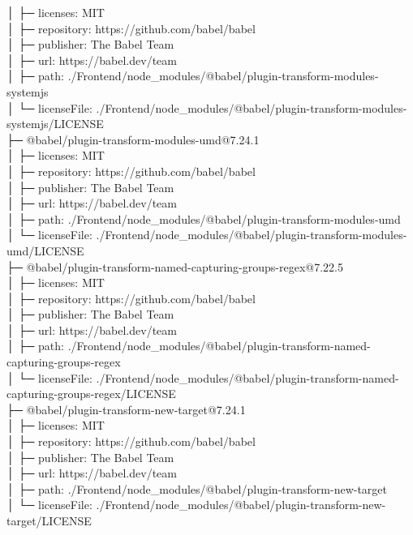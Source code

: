 \documentclass[
    paper=a4,
    twoside=false,
    parskip=half,
    listof=entryprefix,
    listof=totoc,
    index=totoc,
    bibliography=totoc,
    headsepline,
]{scrbook}
\begin{document}
    │  ├─ licenses: MIT\\
    │  ├─ repository: https://github.com/babel/babel\\
    │  ├─ publisher: The Babel Team\\
    │  ├─ url: https://babel.dev/team\\
    │  ├─ path: ./Frontend/node\_modules/@babel/plugin-transform-modules-systemjs\\
    │  └─ licenseFile: ./Frontend/node\_modules/@babel/plugin-transform-modules-systemjs/LICENSE\\
    ├─ @babel/plugin-transform-modules-umd@7.24.1\\
    │  ├─ licenses: MIT\\
    │  ├─ repository: https://github.com/babel/babel\\
    │  ├─ publisher: The Babel Team\\
    │  ├─ url: https://babel.dev/team\\
    │  ├─ path: ./Frontend/node\_modules/@babel/plugin-transform-modules-umd\\
    │  └─ licenseFile: ./Frontend/node\_modules/@babel/plugin-transform-modules-umd/LICENSE\\
    ├─ @babel/plugin-transform-named-capturing-groups-regex@7.22.5\\
    │  ├─ licenses: MIT\\
    │  ├─ repository: https://github.com/babel/babel\\
    │  ├─ publisher: The Babel Team\\
    │  ├─ url: https://babel.dev/team\\
    │  ├─ path: ./Frontend/node\_modules/@babel/plugin-transform-named-capturing-groups-regex\\
    │  └─ licenseFile: ./Frontend/node\_modules/@babel/plugin-transform-named-capturing-groups-regex/LICENSE\\
    ├─ @babel/plugin-transform-new-target@7.24.1\\
    │  ├─ licenses: MIT\\
    │  ├─ repository: https://github.com/babel/babel\\
    │  ├─ publisher: The Babel Team\\
    │  ├─ url: https://babel.dev/team\\
    │  ├─ path: ./Frontend/node\_modules/@babel/plugin-transform-new-target\\
    │  └─ licenseFile: ./Frontend/node\_modules/@babel/plugin-transform-new-target/LICENSE\\
\end{document}
